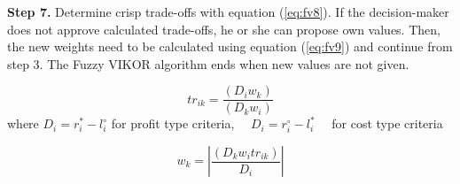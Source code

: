 \noindent \textbf{Step 7.} Determine crisp trade-offs with equation (\ref{eq:fv8}). If the decision-maker does not approve calculated trade-offs, he or she can propose own values. Then, the new weights need to be calculated using equation (\ref{eq:fv9}) and continue from step 3. The Fuzzy VIKOR algorithm ends when new values are not given.

\begin{equation}
t r_{i k}=\frac{\left(D_{i} w_{k}\right)}{\left(D_{k} w_{i}\right)}
\label{eq:fv8}
\end{equation}
where $D_{i}=r_{i}^{*}-l_{i}^{\circ}$ for profit type criteria, $\quad D_{i}=r_{i}^{\circ}-l_{i}^{*} \quad$ for cost type criteria

\begin{equation}
w_{k}=\left|\frac{\left(D_{k} w_{i} t r_{i k}\right)}{D_{i}}\right|
\label{eq:fv9}
\end{equation}